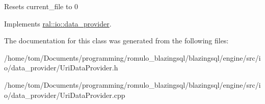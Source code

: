Resets current\+\_\+file to 0 

Implements \hyperlink{classral_1_1io_1_1data__provider_ab762cbdb9fd702a61b48785c84e91536}{ral\+::io\+::data\+\_\+provider}.



The documentation for this class was generated from the following files\+:\begin{DoxyCompactItemize}
\item 
/home/tom/\+Documents/programming/romulo\+\_\+blazingsql/blazingsql/engine/src/io/data\+\_\+provider/Uri\+Data\+Provider.\+h\item 
/home/tom/\+Documents/programming/romulo\+\_\+blazingsql/blazingsql/engine/src/io/data\+\_\+provider/Uri\+Data\+Provider.\+cpp\end{DoxyCompactItemize}
